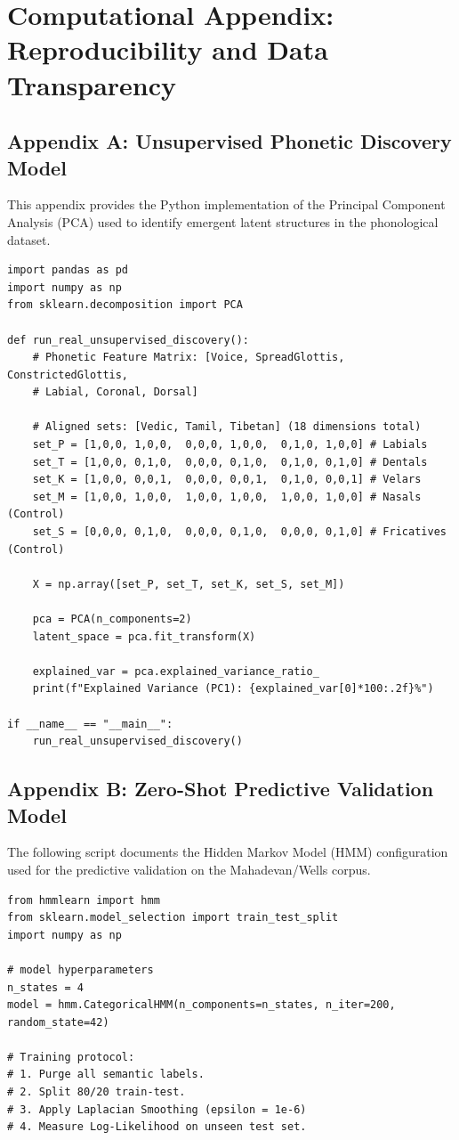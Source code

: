 \chapter{Computational Appendix: Reproducibility and Data Transparency}

\section{Appendix A: Unsupervised Phonetic Discovery Model}
This appendix provides the Python implementation of the Principal Component Analysis (PCA) used to identify emergent latent structures in the phonological dataset. 

\begin{verbatim}
import pandas as pd
import numpy as np
from sklearn.decomposition import PCA

def run_real_unsupervised_discovery():
    # Phonetic Feature Matrix: [Voice, SpreadGlottis, ConstrictedGlottis, 
    # Labial, Coronal, Dorsal]
    
    # Aligned sets: [Vedic, Tamil, Tibetan] (18 dimensions total)
    set_P = [1,0,0, 1,0,0,  0,0,0, 1,0,0,  0,1,0, 1,0,0] # Labials
    set_T = [1,0,0, 0,1,0,  0,0,0, 0,1,0,  0,1,0, 0,1,0] # Dentals
    set_K = [1,0,0, 0,0,1,  0,0,0, 0,0,1,  0,1,0, 0,0,1] # Velars
    set_M = [1,0,0, 1,0,0,  1,0,0, 1,0,0,  1,0,0, 1,0,0] # Nasals (Control)
    set_S = [0,0,0, 0,1,0,  0,0,0, 0,1,0,  0,0,0, 0,1,0] # Fricatives (Control)
    
    X = np.array([set_P, set_T, set_K, set_S, set_M])
    
    pca = PCA(n_components=2)
    latent_space = pca.fit_transform(X)
    
    explained_var = pca.explained_variance_ratio_
    print(f"Explained Variance (PC1): {explained_var[0]*100:.2f}%")
    
if __name__ == "__main__":
    run_real_unsupervised_discovery()
\end{verbatim}

\section{Appendix B: Zero-Shot Predictive Validation Model}
The following script documents the Hidden Markov Model (HMM) configuration used for the predictive validation on the Mahadevan/Wells corpus.

\begin{verbatim}
from hmmlearn import hmm
from sklearn.model_selection import train_test_split
import numpy as np

# model hyperparameters
n_states = 4
model = hmm.CategoricalHMM(n_components=n_states, n_iter=200, random_state=42)

# Training protocol:
# 1. Purge all semantic labels.
# 2. Split 80/20 train-test.
# 3. Apply Laplacian Smoothing (epsilon = 1e-6)
# 4. Measure Log-Likelihood on unseen test set.
\end{verbatim}

